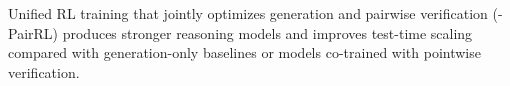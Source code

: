 \par\vspace{\intextsep}
\noindent\begin{minipage}{\textwidth}
\begin{tcolorbox}[title=Takeaway: Co-Training Generation and Pairwise Self-Verification, colback=green!5]
Unified RL training that jointly optimizes generation and pairwise verification (\method{}-PairRL) produces stronger reasoning models and improves test-time scaling compared with generation-only baselines or models co-trained with pointwise verification.
\end{tcolorbox}
\end{minipage}


